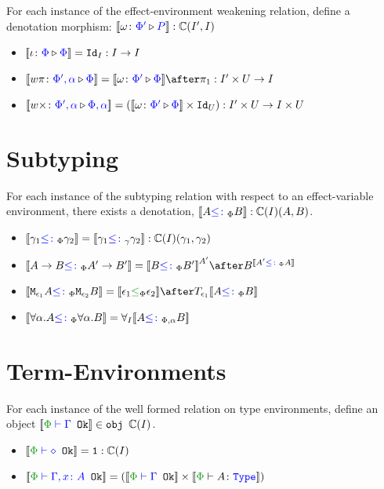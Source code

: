 \documentclass{report}
\begin{document}
For each instance of the effect-environment weakening relation, define a denotation morphism: ${\bf [\![}\omega \colon {\color{blue}\Phi'} \triangleright {\color {blue} P}{\bf ]\!]}: \mathbb{C}(I', I)$

\begin{itemize}
    \item ${\bf [\![}\iota \colon {\color{blue}\Phi} \triangleright {\color {blue} \Phi}{\bf ]\!]} = \texttt{Id}_{I}: I \rightarrow I$
    \item $\deno{\wrel{w\pi}{\P',\a}{\P}} = \deno{\wrelw{\P'}{\P}}\after \p: I'\times U\rightarrow I$
    \item ${\bf [\![}w\times \colon {\color{blue}\Phi',\alpha} \triangleright {\color {blue} \Phi,\alpha}{\bf ]\!]} = ({\bf [\![}\omega \colon {\color{blue}\Phi'} \triangleright {\color {blue} \Phi}{\bf ]\!]}\times \texttt{Id}_{U}): I'\times U\rightarrow I\times U$
\end{itemize}

\section{Subtyping}

For each instance of the subtyping relation with respect  to an effect-variable environment, there exists a denotation, ${\bf [\![}A{\color{blue} \leq\colon}_\Phi B{\bf ]\!]}: \mathbb{C}(I)(A, B)$.

\begin{itemize}
    \item ${\bf [\![}\gamma_1{\color{blue} \leq\colon}_\Phi \gamma_2{\bf ]\!]} = {\bf [\![}\gamma_1{\color{blue} \leq\colon}_\gamma \gamma_2{\bf ]\!]} : \mathbb{C}(I)(\gamma_1, \gamma_2)$
    \item $\deno{\ab \subtypep \fntype{A'}{B'}} = \deno{B\subtypep B'}^{A'}\after B^{\deno{A'\subtypep A}}$
    \item $\deno{\M{\e_1}{A}\subtypep\M{\e_2}{B}} = \deno{\e_1\subeffectp\e_2}\after\T{\e_1}{\deno{A\subtypep B}}$
    \item ${\bf [\![}\forall \alpha. A{\color{blue} \leq\colon}_\Phi\forall \alpha. B{\bf ]\!]} = \forall_I{{\bf [\![}A{\color{blue} \leq\colon}_{\Phi, \alpha} B{\bf ]\!]}}$
\end{itemize}

\section{Term-Environments}
For each instance of the well formed relation on type environments, define an object $\deno{\wellformedok{\P}{\G}}\in\obj\C(I)$.

\begin{itemize}
    \item $\deno{\wellformedok{\P}{\nil}} = \1: \C(I)$
    \item $\deno{\wellformedok{\P}{\gax}} = (\deno{\wellformedok{\P}{\G}} \times \deno{\typerelation{\P}{A}{\type}})$
\end{itemize}
\end{document}
